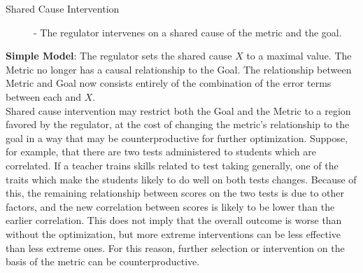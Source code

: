 \documentclass[10pt]{article}
\begin{document}
\begin{figure}[htb]
\centering
{}%
\hspace{0.15cm}
%
\hspace{0.15cm}
%
\end{figure}

\begin{description}
\item[Shared Cause Intervention] - The regulator intervenes on a shared cause of the metric and the goal. 
\end{description}
\textbf{Simple Model}:  The regulator sets the shared cause $X$ to a maximal value. The Metric no longer has a causal relationship to the Goal. The relationship between Metric and Goal now consists entirely of the combination of the error terms between each and $X$.\\

Shared cause intervention may restrict both the Goal and the Metric to a region favored by the regulator, at the cost of changing the metric's relationship to the goal in a way that may be counterproductive for further optimization. Suppose, for example, that there are two tests administered to students which are correlated. If a teacher trains skills related to test taking generally, one of the traits which make the students likely to do well on both tests changes. Because of this, the remaining relationship between scores on the two tests is due to other factors, and the new correlation between scores is likely to be lower than the earlier correlation. This does not imply that the overall outcome is worse than without the optimization, but more extreme interventions can be less effective than less extreme ones. For this reason, further selection or intervention on the basis of the metric can be counterproductive. 
\end{document}
